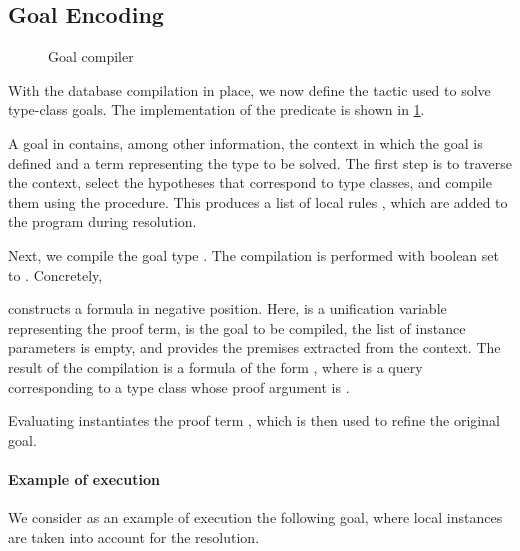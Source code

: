 \subsection{Goal Encoding}
\label{sec:goal-encoding}

\begin{figure}
  
  \caption{Goal compiler}
  \label{fig:goal-compiler}
\end{figure}

With the database compilation in place, we now define the tactic used to
solve type-class goals. The implementation of the  predicate is
shown in \cref{fig:goal-compiler}.

A \rocq goal in \elpi contains, among other information, the context
 in which the goal is defined and a term  representing the
type to be solved. The first step is to traverse the context, select the
hypotheses that correspond to type classes, and compile them using the
 procedure. This produces a list of local rules , which
are added to the program during resolution.

Next, we compile the goal type . The
compilation is performed with boolean set to . Concretely,
%
\begin{center}
\end{center}

\noindent
constructs a formula in negative position. Here,  is a unification
variable representing the proof term,  is the goal to be compiled,
the list of instance parameters is empty, and  provides the
premises extracted from the context. The result of the compilation is a
formula  of the form , where  is a query corresponding
to a type class whose proof argument is .

Evaluating  instantiates the proof term , which is then used
to refine the original \rocq goal.

\paragraph*{Example of execution}

We consider as an example of execution the following \rocq goal,
where local instances are taken into account for the resolution.

\begin{prooftree}
\end{prooftree}

